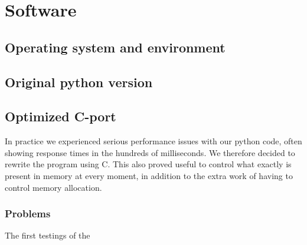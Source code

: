 
\section{Software}
\subsection{Operating system and environment}
\subsection{Original python version}
\subsection{Optimized C-port}
In practice we experienced serious performance issues with our python code, often showing response times in the hundreds of milliseconds. We therefore decided to rewrite the program using C. This also proved useful to control what exactly is present in memory at every moment, in addition to the extra work of having to control memory allocation.
\subsubsection{Problems}
The first testings of the

